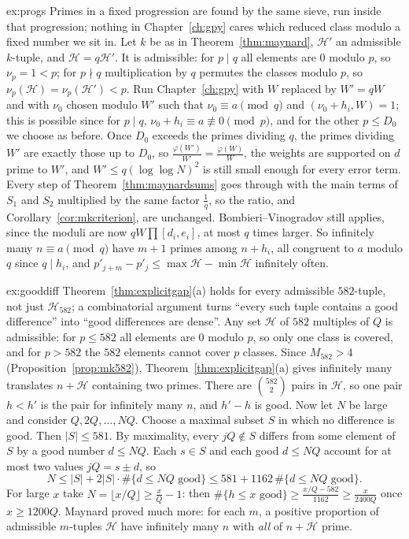 \begin{solution}{ex:progs}
\idea Primes in a fixed progression are found by the same sieve, run inside that progression; nothing in Chapter~\ref{ch:gpy} cares which reduced class modulo a fixed number we sit in.
\writeup Let $k$ be as in Theorem~\ref{thm:maynard}, $\mathcal H'$ an admissible $k$-tuple, and $\mathcal H=q\mathcal H'$. It is admissible: for $p\mid q$ all elements are $0$ modulo $p$, so $\nu_p=1<p$; for $p\nmid q$ multiplication by $q$ permutes the classes modulo $p$, so $\nu_p(\mathcal H)=\nu_p(\mathcal H')<p$. Run Chapter~\ref{ch:gpy} with $W$ replaced by $W'=qW$ and with $\nu_0$ chosen modulo $W'$ such that $\nu_0\equiv a\pmod q$ and $(\nu_0+h_i,W)=1$; this is possible since for $p\mid q$, $\nu_0+h_i\equiv a\not\equiv0\pmod p$, and for the other $p\le D_0$ we choose as before. Once $D_0$ exceeds the primes dividing $q$, the primes dividing $W'$ are exactly those up to $D_0$, so $\frac{\varphi(W')}{W'}=\frac{\varphi(W)}W$, the weights are supported on $d$ prime to $W'$, and $W'\le q(\log\log N)^2$ is still small enough for every error term. Every step of Theorem~\ref{thm:maynardsums} goes through with the main terms of $S_1$ and $S_2$ multiplied by the same factor $\frac1q$, so the ratio, and Corollary~\ref{cor:mkcriterion}, are unchanged. Bombieri--Vinogradov still applies, since the moduli are now $qW\prod[d_i,e_i]$, at most $q$ times larger. So infinitely many $n\equiv a\pmod q$ have $m+1$ primes among $n+h_i$, all congruent to $a$ modulo $q$ since $q\mid h_i$, and $p'_{j+m}-p'_j\le\max\mathcal H-\min\mathcal H$ infinitely often.
\end{solution}

\begin{solution}{ex:gooddiff}
\idea Theorem~\ref{thm:explicitgap}(a) holds for every admissible $582$-tuple, not just $\mathcal H_{582}$; a combinatorial argument turns ``every such tuple contains a good difference'' into ``good differences are dense''.
\writeup Any set $\mathcal H$ of $582$ multiples of $Q$ is admissible: for $p\le582$ all elements are $0$ modulo $p$, so only one class is covered, and for $p>582$ the $582$ elements cannot cover $p$ classes. Since $M_{582}>4$ (Proposition~\ref{prop:mk582}), Theorem~\ref{thm:explicitgap}(a) gives infinitely many translates $n+\mathcal H$ containing two primes. There are $\binom{582}2$ pairs in $\mathcal H$, so one pair $h<h'$ is the pair for infinitely many $n$, and $h'-h$ is good.
Now let $N$ be large and consider $Q,2Q,\dots,NQ$. Choose a maximal subset $S$ in which no difference is good. Then $|S|\le581$. By maximality, every $jQ\notin S$ differs from some element of $S$ by a good number $d\le NQ$. Each $s\in S$ and each good $d\le NQ$ account for at most two values $jQ=s\pm d$, so
\[
N\le|S|+2|S|\cdot\#\{d\le NQ\text{ good}\}\le581+1162\,\#\{d\le NQ\text{ good}\}.
\]
For large $x$ take $N=\lfloor x/Q\rfloor\ge\frac xQ-1$: then $\#\{h\le x\text{ good}\}\ge\frac{x/Q-582}{1162}\ge\frac x{2400Q}$ once $x\ge1200Q$. Maynard proved much more: for each $m$, a positive proportion of admissible $m$-tuples $\mathcal H$ have infinitely many $n$ with \emph{all} of $n+\mathcal H$ prime.
\end{solution}

